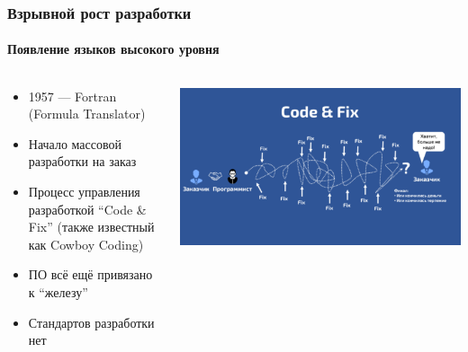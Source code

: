\documentclass{../../slides-style}
\begin{document}
    \begin{frame}
        \frametitle{Взрывной рост разработки}
        \framesubtitle{Появление языков высокого уровня}
        \begin{columns}
            \begin{column}{0.5\textwidth}
                \begin{itemize}
                    \item 1957 --- Fortran (Formula Translator)
                    \item Начало массовой разработки на заказ
                    \item Процесс управления разработкой ``Code \& Fix'' (также известный как Cowboy Coding)
                    \item ПО всё ещё привязано к ``железу''
                    \item Стандартов разработки нет
                \end{itemize}
            \end{column}
            \begin{column}{0.5\textwidth}
                \begin{center}
                    \includegraphics[width=\textwidth]{codeAndFix.png}
                \end{center}
            \end{column}
        \end{columns}
    \end{frame}
\end{document}
